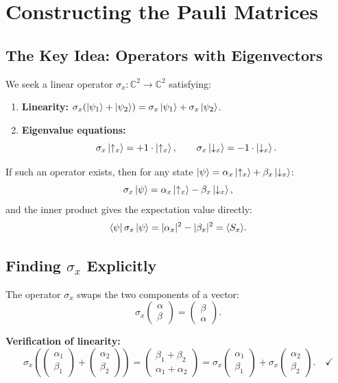 \documentclass[11pt,a4paper]{article}
\theoremstyle{definition}
\theoremstyle{plain}
\theoremstyle{remark}
\begin{document}
\section{Constructing the Pauli Matrices}

\subsection{The Key Idea: Operators with Eigenvectors}

We seek a linear operator $\sigma_x : \mathbb{C}^2 \to \mathbb{C}^2$ satisfying:
\begin{enumerate}[label=(\roman*)]
    \item \textbf{Linearity:} $\sigma_x(\ket{\psi_1} + \ket{\psi_2}) = \sigma_x\ket{\psi_1} + \sigma_x\ket{\psi_2}$.
    \item \textbf{Eigenvalue equations:}
    \[
        \sigma_x\ket{\uparrow_x} = +1 \cdot \ket{\uparrow_x}, \qquad \sigma_x\ket{\downarrow_x} = -1 \cdot \ket{\downarrow_x}.
    \]
\end{enumerate}

If such an operator exists, then for any state $\ket{\psi} = \alpha_x\ket{\uparrow_x} + \beta_x\ket{\downarrow_x}$:
\[
    \sigma_x\ket{\psi} = \alpha_x\ket{\uparrow_x} - \beta_x\ket{\downarrow_x},
\]
and the inner product gives the expectation value directly:
\[
    \bra{\psi}\sigma_x\ket{\psi} = |\alpha_x|^2 - |\beta_x|^2 = \langle S_x \rangle.
\]

\subsection{Finding $\sigma_x$ Explicitly}

The operator $\sigma_x$ swaps the two components of a vector:
\[
    \sigma_x \begin{pmatrix} \alpha \\ \beta \end{pmatrix} = \begin{pmatrix} \beta \\ \alpha \end{pmatrix}.
\]

\textbf{Verification of linearity:}
\[
    \sigma_x\left(\begin{pmatrix}\alpha_1\\\beta_1\end{pmatrix} + \begin{pmatrix}\alpha_2\\\beta_2\end{pmatrix}\right) = \begin{pmatrix}\beta_1+\beta_2\\\alpha_1+\alpha_2\end{pmatrix} = \sigma_x\begin{pmatrix}\alpha_1\\\beta_1\end{pmatrix} + \sigma_x\begin{pmatrix}\alpha_2\\\beta_2\end{pmatrix}. \quad\checkmark
\]
\end{document}
